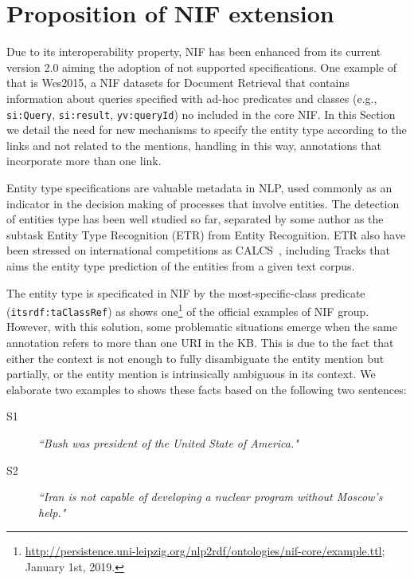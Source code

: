 \documentclass[sigconf]{acmart}
\begin{document}
 

\section{Proposition of NIF extension}
\label{sec:nifmod}

Due to its interoperability property, NIF has been enhanced from its current version 2.0 aiming the adoption of not supported specifications. One example of that is Wes2015, a NIF datasets for Document Retrieval that contains information about queries specified with ad-hoc predicates and classes (e.g., \texttt{si:Query}, \texttt{si:result}, \texttt{yv:queryId}) no included in the core NIF. In this Section we detail the need for new mechanisms to specify the entity type according to the links and not related to the mentions, handling in this way, annotations that incorporate more than one link.

Entity type specifications are valuable metadata in NLP, used commonly as an indicator in the decision making of processes that involve entities. The detection of entities type has been well studied so far, separated by some author as the subtask Entity Type Recognition (ETR) from Entity Recognition. ETR also have been stressed on international competitions as CALCS~\cite{calcs2018shtask}, including Tracks that aims the entity type prediction of the entities from a given text corpus. 

The entity type is specificated in NIF by the most-specific-class predicate (\texttt{itsrdf:taClassRef}) as shows one\footnote{\url{http://persistence.uni-leipzig.org/nlp2rdf/ontologies/nif-core/example.ttl}; January 1st, 2019.} of the official examples of NIF group. However, with this solution, some problematic situations emerge when the same annotation refers to more than one URI in the KB. This is due to the fact that either the context is not enough to fully disambiguate the entity mention but partially, or the entity mention is intrinsically ambiguous in its context. We elaborate two examples to shows these facts based on the following two sentences:

\begin{description}
\item[S1] \textit{``Bush was president of the United State of America."}
\item[S2] \textit{``Iran is not capable of developing a nuclear program without Moscow's help."}
\end{description}
\end{document}
